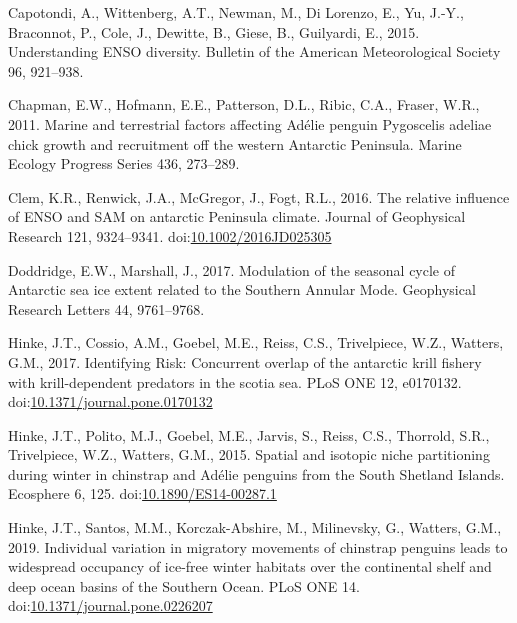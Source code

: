 \documentclass[]{elsarticle} %
\begin{document}
\leavevmode\hypertarget{ref-capotondiUnderstandingENSODiversity2015}{}%
Capotondi, A., Wittenberg, A.T., Newman, M., Di Lorenzo, E., Yu, J.-Y.,
Braconnot, P., Cole, J., Dewitte, B., Giese, B., Guilyardi, E., 2015.
Understanding ENSO diversity. Bulletin of the American Meteorological
Society 96, 921--938.

\leavevmode\hypertarget{ref-chapmanMarineTerrestrialFactors2011}{}%
Chapman, E.W., Hofmann, E.E., Patterson, D.L., Ribic, C.A., Fraser,
W.R., 2011. Marine and terrestrial factors affecting Adélie penguin
Pygoscelis adeliae chick growth and recruitment off the western
Antarctic Peninsula. Marine Ecology Progress Series 436, 273--289.

\leavevmode\hypertarget{ref-Clem2016}{}%
Clem, K.R., Renwick, J.A., McGregor, J., Fogt, R.L., 2016. The relative
influence of ENSO and SAM on antarctic Peninsula climate. Journal of
Geophysical Research 121, 9324--9341.
doi:\href{https://doi.org/10.1002/2016JD025305}{10.1002/2016JD025305}

\leavevmode\hypertarget{ref-doddridgeModulationSeasonalCycle2017}{}%
Doddridge, E.W., Marshall, J., 2017. Modulation of the seasonal cycle of
Antarctic sea ice extent related to the Southern Annular Mode.
Geophysical Research Letters 44, 9761--9768.

\leavevmode\hypertarget{ref-Hinke2017}{}%
Hinke, J.T., Cossio, A.M., Goebel, M.E., Reiss, C.S., Trivelpiece, W.Z.,
Watters, G.M., 2017. Identifying Risk: Concurrent overlap of the
antarctic krill fishery with krill-dependent predators in the scotia
sea. PLoS ONE 12, e0170132.
doi:\href{https://doi.org/10.1371/journal.pone.0170132}{10.1371/journal.pone.0170132}

\leavevmode\hypertarget{ref-Hinke2015}{}%
Hinke, J.T., Polito, M.J., Goebel, M.E., Jarvis, S., Reiss, C.S.,
Thorrold, S.R., Trivelpiece, W.Z., Watters, G.M., 2015. Spatial and
isotopic niche partitioning during winter in chinstrap and Adélie
penguins from the South Shetland Islands. Ecosphere 6, 125.
doi:\href{https://doi.org/10.1890/ES14-00287.1}{10.1890/ES14-00287.1}

\leavevmode\hypertarget{ref-Hinke2019}{}%
Hinke, J.T., Santos, M.M., Korczak-Abshire, M., Milinevsky, G., Watters,
G.M., 2019. Individual variation in migratory movements of chinstrap
penguins leads to widespread occupancy of ice-free winter habitats over
the continental shelf and deep ocean basins of the Southern Ocean. PLoS
ONE 14.
doi:\href{https://doi.org/10.1371/journal.pone.0226207}{10.1371/journal.pone.0226207}
\end{document}
